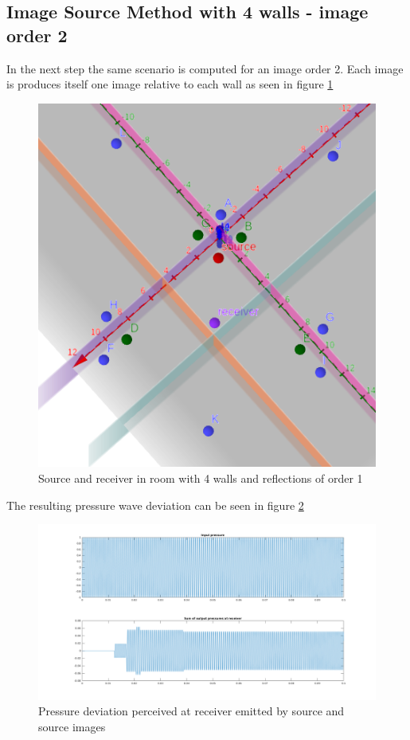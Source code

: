 \subsection{Image Source Method with 4 walls - image order 2}
In the next step the same scenario is computed for an image order 2. Each image is produces itself one image relative to each wall as seen in figure \ref{fig:ism_4_2_geo}\\
\begin{figure}
    \centerline{\includegraphics[width=1\textwidth,keepaspectratio]{LaTeX/images/geometrie/ism_4_walls_order_2.png}}
    \caption{Source and receiver in room with 4 walls and reflections of order 1}
    \label{fig:ism_4_2_geo}
\end{figure}
The resulting pressure wave deviation can be seen in figure \ref{fig:ism_4_2_mat}
\begin{figure}

    \centerline{\includegraphics[width=1.5\textwidth,keepaspectratio]{LaTeX/images/plots/matlab_4_walls_order_2.png}}
    \caption{Pressure deviation perceived at receiver emitted by source and source images}
    \label{fig:ism_4_2_mat}
\end{figure}
\newpage
